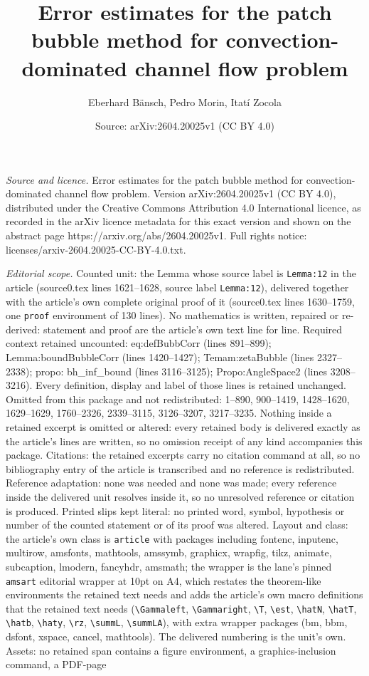 \documentclass[10pt,a4paper]{amsart}
\title[Error estimates for the patch bubble method for convection-d]{Error estimates for the patch bubble method for convection-dominated channel flow problem}
\author{Eberhard B\"ansch, Pedro Morin, Itat\'i Zocola}
\date{Source: arXiv:2604.20025v1 (CC BY 4.0)}
\begin{document}
\maketitle

\noindent\emph{Source and licence.} Error estimates for the patch bubble method for convection-dominated channel flow problem. Version arXiv:2604.20025v1 (CC BY 4.0), distributed under the Creative Commons Attribution 4.0 International licence, as recorded in the arXiv licence metadata for this exact version and shown on the abstract page https://arxiv.org/abs/2604.20025v1. Full rights notice: licenses/arxiv-2604.20025-CC-BY-4.0.txt.\par\smallskip

\noindent\textit{Editorial scope.} Counted unit: the Lemma whose source label is \texttt{Lemma:12} in the article (source0.tex lines 1621--1628, source label \texttt{Lemma:12}), delivered together with the article's own complete original proof of it (source0.tex lines 1630--1759, one \texttt{proof} environment of 130 lines). No mathematics is written, repaired or re-derived: statement and proof are the article's own text line for line. Required context retained uncounted: eq:defBubbCorr (lines 891--899); Lemma:boundBubbleCorr (lines 1420--1427); Temam:zetaBubble (lines 2327--2338); propo: bh\_inf\_bound (lines 3116--3125); Propo:AngleSpace2 (lines 3208--3216). Every definition, display and label of those lines is retained unchanged. Omitted from this package and not redistributed: 1--890, 900--1419, 1428--1620, 1629--1629, 1760--2326, 2339--3115, 3126--3207, 3217--3235. Nothing inside a retained excerpt is omitted or altered: every retained body is delivered exactly as the article's lines are written, so no omission receipt of any kind accompanies this package. Citations: the retained excerpts carry no citation command at all, so no bibliography entry of the article is transcribed and no reference is redistributed. Reference adaptation: none was needed and none was made; every reference inside the delivered unit resolves inside it, so no unresolved reference or citation is produced. Printed slips kept literal: no printed word, symbol, hypothesis or number of the counted statement or of its proof was altered. Layout and class: the article's own class is \texttt{article} with packages including fontenc, inputenc, multirow, amsfonts, mathtools, amssymb, graphicx, wrapfig, tikz, animate, subcaption, lmodern, fancyhdr, amsmath; the wrapper is the lane's pinned \texttt{amsart} editorial wrapper at 10pt on A4, which restates the theorem-like environments the retained text needs and adds the article's own macro definitions that the retained text needs (\texttt{\textbackslash Gammaleft}, \texttt{\textbackslash Gammaright}, \texttt{\textbackslash T}, \texttt{\textbackslash est}, \texttt{\textbackslash hatN}, \texttt{\textbackslash hatT}, \texttt{\textbackslash hatb}, \texttt{\textbackslash haty}, \texttt{\textbackslash rz}, \texttt{\textbackslash summL}, \texttt{\textbackslash summLA}), with extra wrapper packages (bm, bbm, dsfont, xspace, cancel, mathtools). The delivered numbering is the unit's own. Assets: no retained span contains a figure environment, a graphics-inclusion command, a PDF-page 
\end{document}
